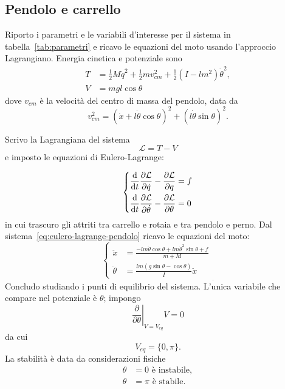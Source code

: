 \subsection{Pendolo e carrello}
Riporto i parametri e le variabili d'interesse per il sistema in 
tabella~\ref{tab:parametri} e ricavo le equazioni del moto
usando l'approccio Lagrangiano.
Energia cinetica e potenziale sono
\begin{align*}
        T &= \frac 1 2 M  \dot q^2 + \frac 1 2 m v_{cm}^2 + \frac 1 2 (I - lm^2)\dot \theta^2, \\ %
        V &= mgl \cos\theta
\end{align*}
dove $v_{cm}$ è la velocità del centro di massa del pendolo, data da
\begin{equation*}
    v^2_{cm} = (\dot x + l \dot \theta \cos \theta)^2 + (l \dot \theta \sin \theta)^2.
\end{equation*}




Scrivo la Lagrangiana del sistema
\begin{equation*}
    \mathcal L = T - V
\end{equation*}
e imposto le equazioni di Eulero-Lagrange:

\begin{equation}
        \left\{
        \begin{aligned}
            \totald t \partiald{\dot q} {\mathcal L} - \partiald q {\mathcal L} &= f \\
            \totald t \partiald{\dot \theta} {\mathcal L}  - \partiald \theta {\mathcal L} &= 0
        \end{aligned}
        \right.
        \label{eq:eulero-lagrange-pendolo}
\end{equation}
in cui trascuro gli attriti tra carrello e rotaia e tra
pendolo e perno.
Dal sistema~\eqref{eq:eulero-lagrange-pendolo} ricavo le equazioni del moto:
\begin{equation}
        \left\{
        \begin{aligned}
            \ddot x &= \frac {-lm \ddot \theta \cos \theta + lm \dot \theta^2 \sin \theta + f} {m + M} \\
            \ddot \theta &= \frac {lm (g\sin \theta - \cos \theta) }{I} \ddot x
        \end{aligned}
    \right.
    _.
    \label{eq:moto-sistema}
\end{equation}
Concludo studiando i punti di equilibrio del sistema.
L'unica variabile che compare nel potenziale è $\theta$; impongo
\begin{equation*}
    \left. \frac \partial {\partial \theta}\right |_{V=V_{eq}} V =  0
\end{equation*}
da cui
\begin{equation*}
     V_{eq} = \{0, \pi\}.
\end{equation*}
La stabilità è data da considerazioni fisiche
\begin{align*}
    \theta &= 0  \text{ è instabile}, \\
    \theta &= \pi  \text{ è stabile}.
\end{align*}

